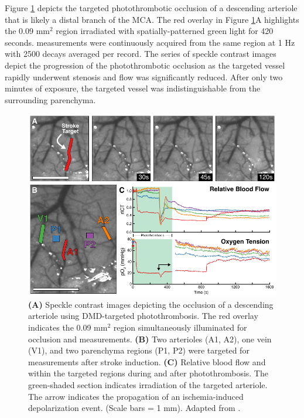 Figure \ref{fig:photothrombosisacute} depicts the targeted photothrombotic occlusion of a descending arteriole that is likely a distal branch of the MCA. The red overlay in Figure \ref{fig:photothrombosisacute}A highlights the 0.09 mm$^2$ region irradiated with spatially-patterned green light for 420 seconds.  measurements were continuously acquired from the same region at 1 Hz with 2500 decays averaged per record. The series of speckle contrast images depict the progression of the photothrombotic occlusion as the targeted vessel rapidly underwent stenosis and flow was significantly reduced. After only two minutes of exposure, the targeted vessel was indistinguishable from the surrounding parenchyma.

\begin{figure}
    \includegraphics{figures/chapter_3/photothrombosisacute.pdf}
    \caption[Acute measurements of blood flow and  during DMD-targeted photothrombosis.]{
        \label{fig:photothrombosisacute}
        \textbf{(A)} Speckle contrast images depicting the occlusion of a descending arteriole using DMD-targeted photothrombosis. The red overlay indicates the 0.09 mm$^2$ region simultaneously illuminated for occlusion and  measurements. \textbf{(B)} Two arterioles (A1, A2), one vein (V1), and two parenchyma regions (P1, P2) were targeted for  measurements after stroke induction. \textbf{(C)} Relative blood flow and  within the targeted regions during and after photothrombosis. The green-shaded section indicates irradiation of the targeted arteriole. The arrow indicates the propagation of an ischemia-induced depolarization event. (Scale bars = 1 mm). Adapted from \cite{Sullender:2018ff}.
    }
\end{figure}

